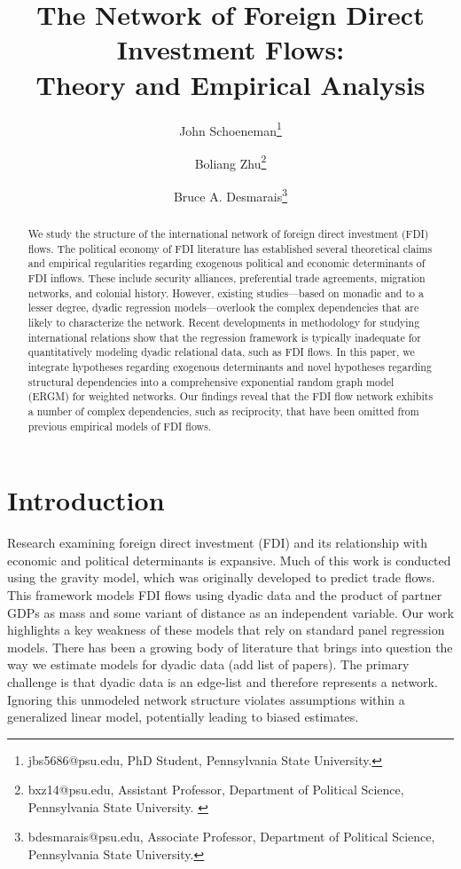 \documentclass{article}
\begin{document}
\title{The Network of Foreign Direct Investment Flows: \\Theory and Empirical Analysis}
\author{John  Schoeneman\thanks{\footnotesize{
jbs5686@psu.edu, PhD Student, Pennsylvania State University.}} \and Boliang Zhu\thanks{\footnotesize{bxz14@psu.edu, Assistant Professor, Department of Political Science, Pennsylvania State University. }} \and Bruce A. Desmarais\thanks{\footnotesize{
bdesmarais@psu.edu, Associate Professor, Department of Political Science, Pennsylvania State University.}}}
\date{}
\maketitle

\singlespacing
\begin{abstract} 
    \noindent We study the structure of the international network of foreign direct investment (FDI) flows. The political economy of FDI literature has established several theoretical claims and empirical regularities regarding exogenous political and economic determinants of FDI inflows. These include security alliances, preferential trade agreements, migration networks, and colonial history. However, existing studies---based on monadic and to a lesser degree, dyadic regression models---overlook the complex dependencies that are likely to characterize the network. Recent developments in methodology for studying international relations show that the regression framework is typically inadequate for quantitatively modeling dyadic relational data, such as FDI flows. In this paper, we integrate hypotheses regarding exogenous determinants and novel hypotheses regarding structural dependencies into a comprehensive exponential random graph model (ERGM) for weighted networks. Our findings reveal that the FDI flow network  exhibits a number of complex dependencies, such as reciprocity, that have been omitted from previous empirical models of FDI flows.

\end{abstract}

\section{Introduction}

Research examining foreign direct investment (FDI) and its relationship with economic and political determinants is expansive. Much of this work is conducted using the gravity model, which was originally developed to predict trade flows. This framework models FDI flows using dyadic data and the product of partner GDPs as mass and some variant of distance as an independent variable. Our work highlights a key weakness of these models that rely on standard panel regression models. There has been a growing body of literature that brings into question the way we estimate models for dyadic data (add list of papers). The primary challenge is that dyadic data is an edge-list and therefore represents a network. Ignoring this unmodeled network structure violates assumptions within a generalized linear model, potentially leading to biased estimates.
\newpage
\end{document}
